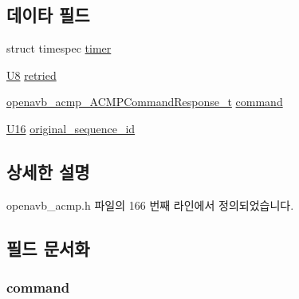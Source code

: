 \subsection*{데이타 필드}
\begin{DoxyCompactItemize}
\item 
struct timespec \hyperlink{structopenavb__acmp___inflight_command__t_ab749c97f222e4394a7656539ec08c311}{timer}
\item 
\hyperlink{openavb__types__base__pub_8h_aa63ef7b996d5487ce35a5a66601f3e73}{U8} \hyperlink{structopenavb__acmp___inflight_command__t_a21ec179e61e9198072d8818797605bd2}{retried}
\item 
\hyperlink{structopenavb__acmp___a_c_m_p_command_response__t}{openavb\+\_\+acmp\+\_\+\+A\+C\+M\+P\+Command\+Response\+\_\+t} \hyperlink{structopenavb__acmp___inflight_command__t_ac015290429c34e4109010b42aa36c8b6}{command}
\item 
\hyperlink{openavb__types__base__pub_8h_a0a0a322d5fa4a546d293a77ba8b4a71f}{U16} \hyperlink{structopenavb__acmp___inflight_command__t_adfbdfa9aa285b3350f4454bc0bf96cb9}{original\+\_\+sequence\+\_\+id}
\end{DoxyCompactItemize}


\subsection{상세한 설명}


openavb\+\_\+acmp.\+h 파일의 166 번째 라인에서 정의되었습니다.



\subsection{필드 문서화}
\subsubsection[{\texorpdfstring{command}{command}}]{ command}\hypertarget{structopenavb__acmp___inflight_command__t_ac015290429c34e4109010b42aa36c8b6}{}\label{structopenavb__acmp___inflight_command__t_ac015290429c34e4109010b42aa36c8b6}


